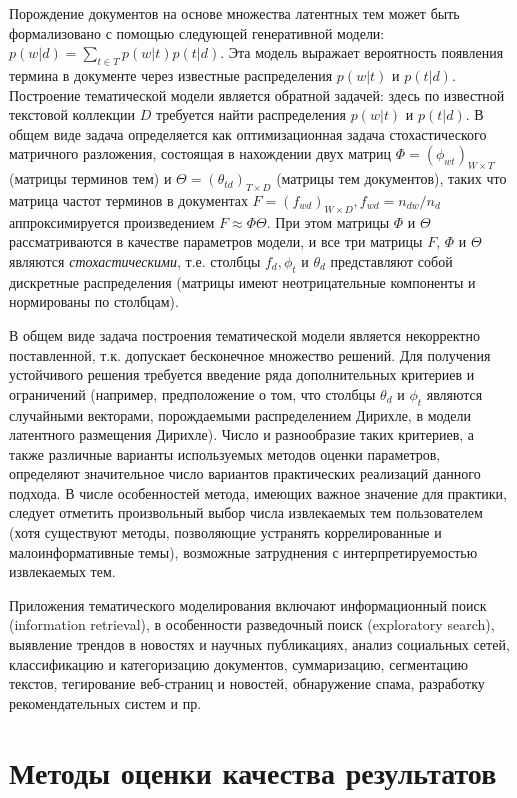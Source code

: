 Порождение документов на основе множества латентных тем может быть формализовано с помощью следующей генеративной модели: $p(w|d) = \sum_{t \in T}p(w|t)p(t|d)$. Эта модель выражает вероятность появления термина в документе через известные распределения $p(w|t)$ и $p(t|d)$. Построение тематической модели является обратной задачей: здесь по известной текстовой коллекции $D$ требуется найти распределения $p(w|t)$ и $p(t|d)$. В общем виде задача определяется как оптимизационная задача стохастического матричного разложения, состоящая в нахождении двух матриц $\Phi = (\phi_{wt})_{W \times T}$ (матрицы терминов тем) и $\Theta = (\theta_{td})_{T \times D}$ (матрицы тем документов), таких что матрица частот терминов в документах $F=(f_{wd})_{W \times D}, f_{wd} = n_{dw} / n_d$ аппроксимируется произведением $F \approx \Phi \Theta$. При этом матрицы $\Phi$ и $\Theta$ рассматриваются в качестве параметров модели, и все три матрицы $F$, $\Phi$ и $\Theta$ являются \textit{стохастическими}, т.е. столбцы $f_d, \phi_t$ и $\theta_d$ представляют собой дискретные распределения (матрицы имеют неотрицательные компоненты и нормированы по столбцам).

В общем виде задача построения тематической модели является некорректно поставленной, т.к. допускает бесконечное множество решений. Для получения устойчивого решения требуется введение ряда дополнительных критериев и ограничений (например, предположение о том, что столбцы $\theta_d$ и $\phi_t$ являются случайными векторами, порождаемыми распределением Дирихле, в модели латентного размещения Дирихле). Число и разнообразие таких критериев, а также различные варианты используемых методов оценки параметров, определяют значительное число вариантов практических реализаций данного подхода. В числе особенностей метода, имеющих важное значение для практики, следует отметить произвольный выбор числа извлекаемых тем пользователем (хотя существуют методы, позволяющие устранять коррелированные и малоинформативные темы), возможные затруднения с интерпретируемостью извлекаемых тем.

Приложения тематического моделирования включают информационный поиск (information retrieval), в особенности разведочный поиск (exploratory search), выявление трендов в новостях и научных публикациях, анализ социальных сетей, классификацию и категоризацию документов, суммаризацию, сегментацию текстов, тегирование веб-страниц и новостей, обнаружение спама, разработку рекомендательных систем и пр. \parencite{vorontsov2015topic}


\section{Методы оценки качества результатов}

